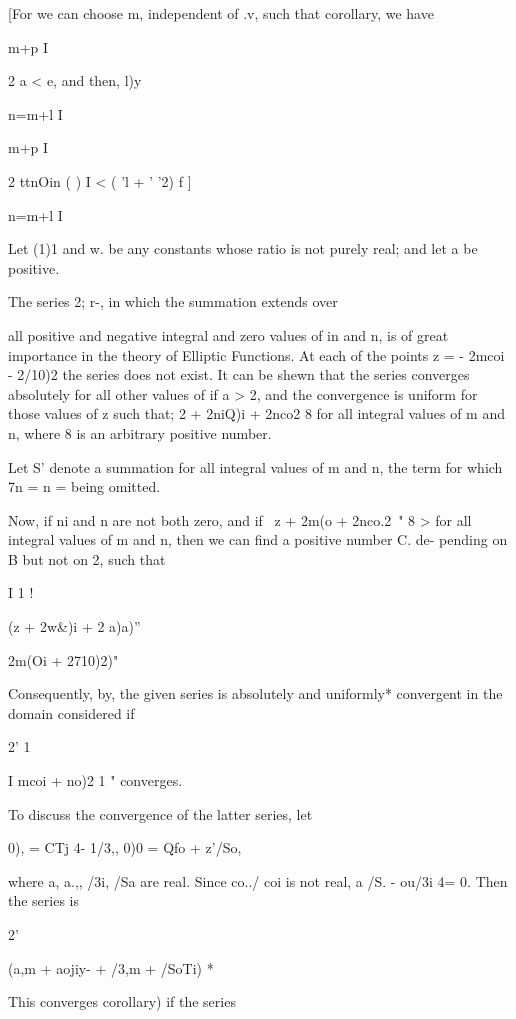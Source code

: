 %
%

[For we can choose m, independent of .v, such that corollary, we have

m+p I

2 a < e, and then, l)y

n=m+l I

m+p I

2 ttnOin ( ) I < ( 'l + ' '2) f ]

n=m+l I


Let (1)1 and w. be any constants whose ratio is not purely real; and
let a be positive.

The series 2; r-, in which the summation extends over

all positive and negative integral and zero values of in and n, is of
great importance in the theory of Elliptic Functions. At each of the
points z = - 2mcoi - 2/10)2 the series does not exist. It can be shewn
that the series converges absolutely for all other values of if a > 2,
and the convergence is uniform for those values of z such that; 2 +
2niQ)i + 2nco2 8 for all integral values of m and n, where 8 is an
arbitrary positive number.

Let S' denote a summation for all integral values of m and n, the term
for which 7n = n = being omitted.

Now, if ni and n are not both zero, and if \ z + 2m(o + 2nco.2\ " 8 >
for all integral values of m and n, then we can find a positive number
C. de- pending on B but not on 2, such that

I 1 !

(z + 2w\&)i + 2 a)a)''

 2m(Oi + 2710)2)"

Consequently, by, the given series is absolutely and uniformly*
convergent in the domain considered if

2' 1

I mcoi + no)2 1 " converges.

To discuss the convergence of the latter series, let

0), = CTj 4- 1/3,, 0)0 = Qfo + z'/So,

where a, a.,, /3i, /Sa are real. Since co../ coi is not real, a /S. -
ou/3i 4= 0. Then the series is

2'

 (a,m + aojiy- + /3,m + /SoTi) *

This converges  corollary) if the series

